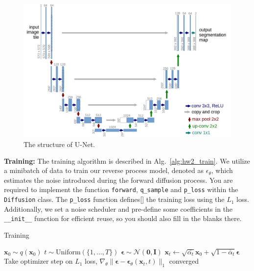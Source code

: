 \documentclass[11pt,addpoints,answers]{exam}
\newcommand{\xv}{\mathbf{x}}
\newcommand{\epsilonv   }{\boldsymbol \epsilon   }
\begin{document}
\begin{questions}
    \begin{figure}[H]
        \centering
        \includegraphics[width=0.5\linewidth]{fig/unet_architecture.jpeg}
        \caption{The structure of U-Net.}
        \label{fig:unet}
    \end{figure}


    \textbf{Training:} The training algorithm is described in Alg.~\ref{alg:hw2_train}. We utilize a minibatch of data to train our reverse process model, denoted as $\epsilon_\theta$, which estimates the noise introduced during the forward diffusion process. You are required to implement the function \lstinline{forward}, \lstinline{q_sample} and \lstinline{p_loss} within the \lstinline{Diffusion} class. The \lstinline{p_loss} function defines[] the training loss using the $L_1$ loss. Additionally, we set a noise scheduler and pre-define some coefficients in the \lstinline{__init__} function for efficient reuse, so you should also fill in the blanks there. 

    \begin{center}
    \begin{minipage}{.8\linewidth}
    \begin{algorithm}[H]
    \caption{Training}\label{alg:hw2_train}
        \begin{algorithmic}[1]
            \Repeat
            \State $\xv_0 \sim q(\xv_0)$
            \State $t\sim \text{Uniform}(\{1,...,T\})$
            \State $\epsilonv \sim \mathcal{N}(\boldsymbol{0},\boldsymbol{I})$
            \State $\xv_t \gets \sqrt{\bar{\alpha_t}}\xv_0 + \sqrt{1 - \bar\alpha_t} \epsilonv$ 
            \State Take optimizer step on $L_1$ loss, 
             $\nabla_\theta \| \epsilonv - \boldsymbol{\epsilon}_\theta (\xv_t, t) \|_1$
            \Until converged
        \end{algorithmic}
    \end{algorithm}
    \end{minipage}
    \end{center}
    \vspace{1em}



\end{questions}
\end{document}
